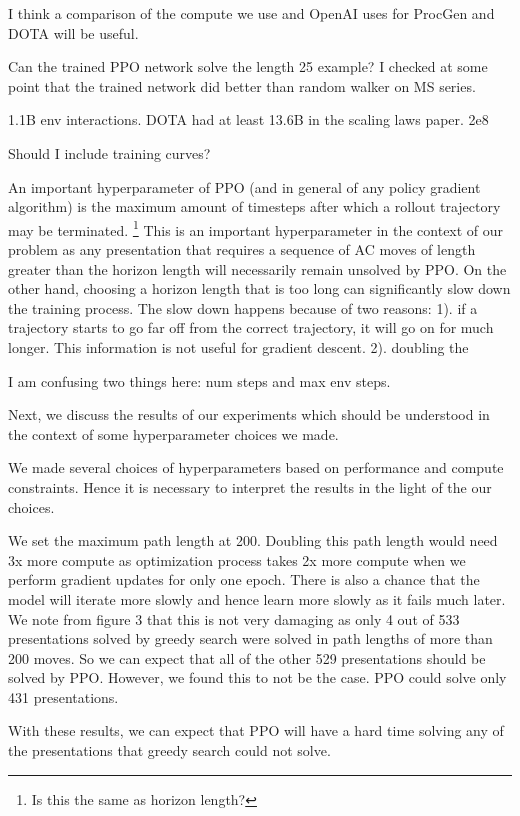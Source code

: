 I think a comparison of the compute we use and OpenAI uses for ProcGen and DOTA will be useful.

Can the trained PPO network solve the length 25 example? I checked at some point that the trained network did better than random walker on MS series.

1.1B env interactions. DOTA had at least 13.6B in the scaling laws paper. 2e8 

Should I include training curves?

An important hyperparameter of PPO (and in general of any policy gradient algorithm) is the maximum amount of timesteps after which a rollout trajectory may be terminated.
\footnote{Is this the same as horizon length?}
This is an important hyperparameter in the context of our problem as any presentation that requires a sequence of AC moves of length greater than the horizon length will necessarily remain unsolved by PPO. On the other hand, choosing a horizon length that is too long can significantly slow down the training process. The slow down happens because of two reasons: 1). if a trajectory starts to go far off from the correct trajectory, it will go on for much longer. This information is not useful for gradient descent. 2). doubling the 

I am confusing two things here: num steps and max env steps. 

Next, we discuss the results of our experiments which should be understood in the context of some hyperparameter choices we made. 

We made several choices of hyperparameters based on performance and compute constraints. Hence it is necessary to interpret the results in the light of the our choices.

We set the maximum path length at 200. Doubling this path length would need 3x more compute as optimization process takes 2x more compute when we perform gradient updates for only one epoch. There is also a chance that the model will iterate more slowly and hence learn more slowly as it fails much later. We note from figure 3 that this is not very damaging as only 4 out of 533 presentations solved by greedy search were solved in path lengths of more than 200 moves. So we can expect that all of the other 529 presentations should be solved by PPO. However, we found this to not be the case. PPO could solve only 431 presentations. 

With these results, we can expect that PPO will have a hard time solving any of the presentations that greedy search could not solve. 


